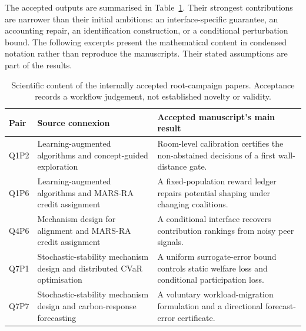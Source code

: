 \documentclass[11pt,a4paper]{article}
\newcommand{\pair}[1]{\mbox{#1}}
\begin{document}
The accepted outputs are summarised in Table~\ref{tab:pilot-papers}. Their
strongest contributions are narrower than their initial ambitions: an
interface-specific guarantee, an accounting repair, an identification
construction, or a conditional perturbation bound. The following excerpts
present the mathematical content in condensed notation rather than reproduce the
manuscripts. Their stated assumptions are part of the results.

\begin{table}[b]
\centering
\small
\begin{tabularx}{\linewidth}{@{}l>{\raggedright\arraybackslash}X>{\raggedright\arraybackslash}X@{}}
\toprule
Pair & Source connexion & Accepted manuscript's main result \\
\midrule
\pair{Q1P2} & Learning-augmented algorithms and concept-guided exploration &
Room-level calibration certifies the non-abstained decisions of a first
wall-distance gate. \\
\pair{Q1P6} & Learning-augmented algorithms and MARS-RA credit assignment & A
fixed-population reward ledger repairs potential shaping under changing
coalitions. \\
\pair{Q4P6} & Mechanism design for alignment and MARS-RA credit assignment & A
conditional interface recovers contribution rankings from noisy peer signals. \\
\pair{Q7P1} & Stochastic-stability mechanism design and distributed CVaR optimisation
& A uniform surrogate-error bound controls static welfare loss and conditional
participation loss. \\
\pair{Q7P7} & Stochastic-stability mechanism design and carbon-response forecasting &
A voluntary workload-migration formulation and a directional forecast-error
certificate. \\
\bottomrule
\end{tabularx}
\caption{Scientific content of the internally accepted root-campaign papers.
Acceptance records a workflow judgement, not established novelty or validity.}
\label{tab:pilot-papers}
\end{table}


\end{document}
